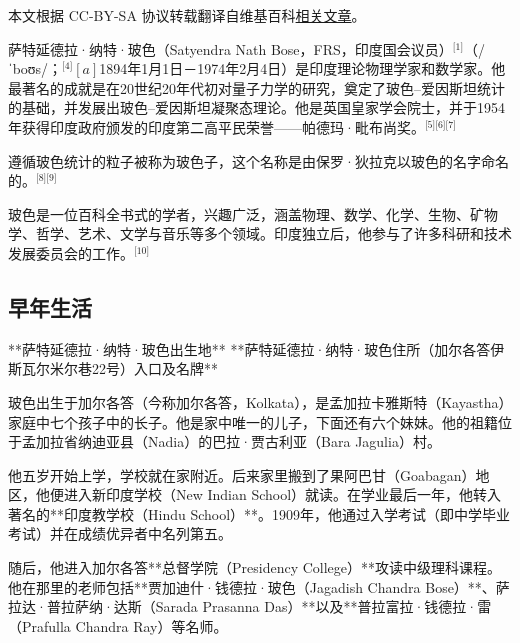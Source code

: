 
本文根据 CC-BY-SA 协议转载翻译自维基百科\href{https://en.wikipedia.org/wiki/Satyendra_Nath_Bose}{相关文章}。

萨特延德拉·纳特·玻色（Satyendra Nath Bose，FRS，印度国会议员）\(^\text{[1]}\)（/ˈboʊs/；\(^\text{[4]}[a]\)1894年1月1日－1974年2月4日）是印度理论物理学家和数学家。他最著名的成就是在20世纪20年代初对量子力学的研究，奠定了玻色–爱因斯坦统计的基础，并发展出玻色–爱因斯坦凝聚态理论。他是英国皇家学会院士，并于1954年获得印度政府颁发的印度第二高平民荣誉——帕德玛·毗布尚奖。\(^\text{[5][6][7]}\)

遵循玻色统计的粒子被称为玻色子，这个名称是由保罗·狄拉克以玻色的名字命名的。\(^\text{[8][9]}\)

玻色是一位百科全书式的学者，兴趣广泛，涵盖物理、数学、化学、生物、矿物学、哲学、艺术、文学与音乐等多个领域。印度独立后，他参与了许多科研和技术发展委员会的工作。\(^\text{[10]}\)
\subsection{早年生活}

**萨特延德拉·纳特·玻色出生地**
**萨特延德拉·纳特·玻色住所（加尔各答伊斯瓦尔米尔巷22号）入口及名牌**

玻色出生于加尔各答（今称加尔各答，Kolkata），是孟加拉卡雅斯特（Kayastha）家庭中七个孩子中的长子。他是家中唯一的儿子，下面还有六个妹妹。他的祖籍位于孟加拉省纳迪亚县（Nadia）的巴拉·贾古利亚（Bara Jagulia）村。

他五岁开始上学，学校就在家附近。后来家里搬到了果阿巴甘（Goabagan）地区，他便进入新印度学校（New Indian School）就读。在学业最后一年，他转入著名的**印度教学校（Hindu School）**。1909年，他通过入学考试（即中学毕业考试）并在成绩优异者中名列第五。

随后，他进入加尔各答**总督学院（Presidency College）**攻读中级理科课程。他在那里的老师包括**贾加迪什·钱德拉·玻色（Jagadish Chandra Bose）**、\*\*萨拉达·普拉萨纳·达斯（Sarada Prasanna Das）**以及**普拉富拉·钱德拉·雷（Prafulla Chandra Ray）\*\*等名师。
